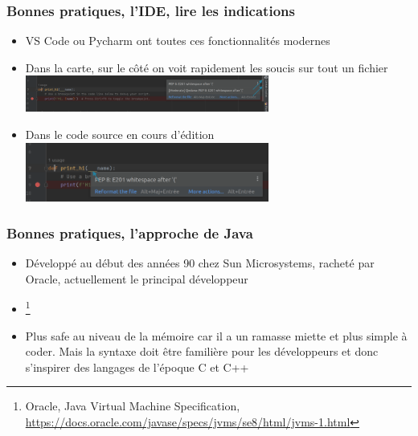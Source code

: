 \documentclass{beamer}
\begin{document}
    \begin{frame}
        \transdissolve
        \frametitle{Bonnes pratiques, l'IDE, lire les indications}

        \begin{itemize}
            \item VS Code ou Pycharm ont toutes ces fonctionnalités modernes
            \item Dans la carte, sur le côté on voit rapidement les soucis sur tout un fichier
            \bigbreak
            \includegraphics[width=8cm]{image/Pycharm-minimap.png}
            \item Dans le code source en cours d'édition
            \bigbreak
            \includegraphics[width=8cm]{image/Pycharm-waring-in-code.png}
        \end{itemize}

    \end{frame}

    \begin{frame}
        \transdissolve
        \frametitle{Bonnes pratiques, l'approche de Java}

        \begin{itemize}

            \item Développé au début des années 90 chez Sun Microsystems, racheté par Oracle, actuellement le principal développeur
            \item {}\footnote{Oracle, Java Virtual Machine Specification, \url{https://docs.oracle.com/javase/specs/jvms/se8/html/jvms-1.html}}
            \item Plus safe au niveau de la mémoire car il a un ramasse miette et plus simple à coder.
            Mais la syntaxe doit être familière pour les développeurs et donc s'inspirer des langages de l'époque C et C++

        \end{itemize}

    \end{frame}
\end{document}
